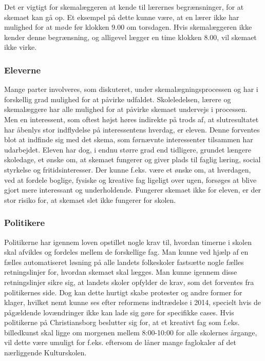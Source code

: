 Det er vigtigt for skemalæggeren at kende til lærernes begrænsninger, for at skemaet kan gå op. Et eksempel på dette kunne være, at en lærer ikke har mulighed for at møde før klokken 9.00 om torsdagen. Hvis skemalæggeren ikke kender denne begrænsning, og alligevel lægger en time klokken 8.00, vil skemaet ikke virke. 

\subsubsection{Eleverne}
Mange parter involveres, som diskuteret, under skemalægningsprocessen og har i forskellig grad mulighed for at påvirke udfaldet. Skoleledelsen, lærere og skemalæggere har alle mulighed for at påvirke skemaet undervejs i processen. Men en interessent, som oftest højst høres indirekte på trods af, at slutresultatet har åbenlys stor indflydelse på interessentens hverdag, er eleven. Denne forventes blot at indfinde sig med det skema, som førnævnte interessenter tilsammen har udarbejdet. Eleven har dog, i endnu større grad end tidligere, grundet længere skoledage, et ønske om, at skemaet fungerer og giver plads til faglig læring, social styrkelse og fritidsinteresser. Der kunne f.eks. være et ønske om, at hverdagen, ved at fordele boglige, fysiske og kreative fag ligeligt over ugen, forsøges at blive gjort mere interessant og underholdende. Fungerer skemaet ikke for eleven, er der stor risiko for, at skemaet slet ikke fungerer for skolen.

\subsubsection{Politikere}
Politikerne har igennem loven opstillet nogle krav til, hvordan timerne i skolen skal afvikles og fordeles mellem de forskellige fag. Man kunne ved hjælp af en fælles automatiseret løsning på alle landets folkeskoler fastsætte nogle fælles retningslinjer for, hvordan skemaet skal lægges. Man kunne igennem disse retningslinjer sikre sig, at landets skoler opfylder de krav, som det forventes fra politikernes side. Dog kan dette hurtigt skabe protester og andre former for klager, hvilket nemt kunne ses efter reformens indtrædelse i 2014\cite{LaererBrok}, specielt hvis de pågældende lovændringer ikke kan lade sig gøre for specifikke cases. Hvis politikerne på Christiansborg beslutter sig for, at et kreativt fag som f.eks. billedkunst skal ligge om morgenen mellem 8:00-10:00 for alle skolernes årgange, vil dette være umuligt for f.eks. \school eftersom de låner mange faglokaler af det nærliggende Kulturskolen\cite{interview_Kaerby}. 

